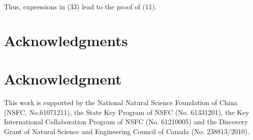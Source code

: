 \documentclass[10pt,journal,compsoc]{IEEEtran}
\begin{document}
Thus, expressions in (33) lead to the proof of (11).\\\indent

%





\ifCLASSOPTIONcompsoc
  \section*{Acknowledgments}
\else
  \section*{Acknowledgment}
\fi

This work is supported by the National Natural Science
Foundation of China (NSFC, No.61071211), the State Key
Program of NSFC (No. 61331201), the Key International
Collaboration Program of NSFC (No. 61210005) and the
Discovery Grant of Natural Science and Engineering Council
of Canada (No. 238813/2010).


\ifCLASSOPTIONcaptionsoff
  \newpage
\fi
\end{document}
